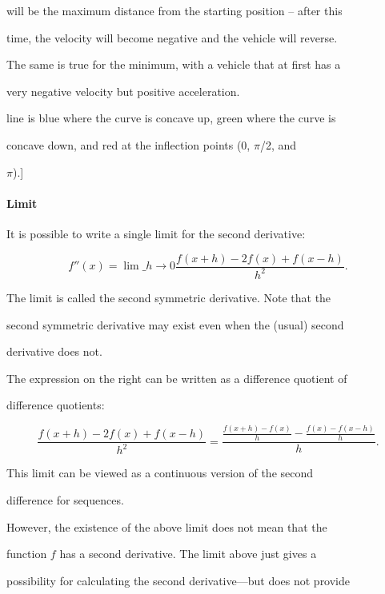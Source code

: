 will be the maximum distance from the starting position -- after this

time, the velocity will become negative and the vehicle will reverse.

The same is true for the minimum, with a vehicle that at first has a

very negative velocity but positive acceleration.




line is blue where the curve is concave up, green where the curve is

concave down, and red at the inflection points (0, $\pi$/2, and

$\pi$).]



\paragraph{Limit}



It is possible to write a single limit for the second derivative:



$$f''(x) = \lim\_{h \to 0} \frac{f(x+h) - 2f(x) + f(x-h)}{h^2}.$$



The limit is called the second symmetric derivative. Note that the

second symmetric derivative may exist even when the (usual) second

derivative does not.



The expression on the right can be written as a difference quotient of

difference quotients:



$$\frac{f(x+h) - 2f(x) + f(x-h)}{h^2} = \frac{\frac{f(x+h) - f(x)}{h} - \frac{f(x) - f(x-h)}{h}}{h}.$$



This limit can be viewed as a continuous version of the second

difference for sequences.



However, the existence of the above limit does not mean that the

function $f$ has a second derivative. The limit above just gives a

possibility for calculating the second derivative---but does not provide

